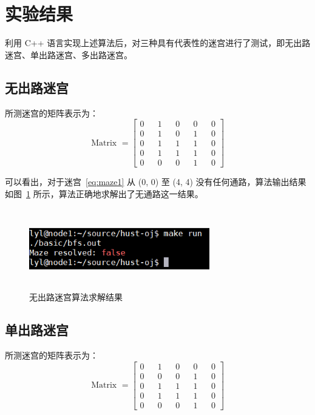 \documentclass[UTF8,cs4size]{ctexart}
\begin{document}
\section{实验结果}
利用 C++ 语言实现上述算法后，对三种具有代表性的迷宫进行了测试，即无出路迷宫、单出路迷宫、多出路迷宫。
\subsection{无出路迷宫}
所测迷宫的矩阵表示为：
\begin{equation}
  \text{Matrix } =
  \begin{bmatrix}
    0 && 1 && 0 && 0 && 0 \\
    0 && 1 && 0 && 1 && 0 \\
    0 && 1 && 1 && 1 && 0 \\
    0 && 1 && 1 && 1 && 0 \\
    0 && 0 && 0 && 1 && 0
    \label{eq:maze1}
  \end{bmatrix}
\end{equation}

可以看出，对于迷宫~\eqref{eq:maze1} 从 (0, 0) 至 (4, 4) 没有任何通路，算法输出结果如图~\ref{fig:maze1} 所示，算法正确地求解出了无通路这一结果。
\begin{figure}[htb]
  \centering
    \includegraphics[width=0.7\textwidth,height=3.5cm]{figures/assign1_maze1.png}
  \caption{无出路迷宫算法求解结果}
  \label{fig:maze1}
\end{figure}

\subsection{单出路迷宫}
所测迷宫的矩阵表示为：
\begin{equation}
  \text{Matrix } =
  \begin{bmatrix}
    0 && 1 && 0 && 0 && 0 \\
    0 && 0 && 0 && 1 && 0 \\
    0 && 1 && 1 && 1 && 0 \\
    0 && 1 && 1 && 1 && 0 \\
    0 && 0 && 0 && 1 && 0
    \label{eq:maze2}
  \end{bmatrix}
\end{equation}
\end{document}
